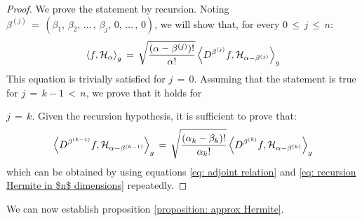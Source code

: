 \iflong \begin{proof}
    We prove the statement by recursion. Noting
    $\beta^{(j)}\,=\,(\beta_1,\,\beta_2,\,\dots\,,\,\beta_j,\, 0, \, \dots\,, \, 0) $, we will
    show that, for every $0\, \leq \,j\, \leq \,n$:
    $$
        \left \langle f, \mathcal H_\alpha \right \rangle_g \,=\,\sqrt{\frac
                {(\alpha-\beta^{(j)})!}{\alpha!}} \left \langle D^{\beta^{(j)}} f, \mathcal H_{\alpha-\beta^{(j)}} \right \rangle_g
    $$
    This equation is trivially satisfied for $j\,=\,0$. Assuming that the
    statement is true for $j\,=\,k-1\,<\,n$, we prove that it holds for

    $j\,=\,k$. Given the recursion hypothesis, it is sufficient to prove that:
    $$
        \left \langle
            D^{\beta^{(k-1)}} f, \mathcal H_{\alpha-\beta^{(k-1)}} \right
        \rangle_g \,=\,\sqrt{\frac {(\alpha_k-\beta_k)!}{\alpha_k!}} \left \langle
            D^{\beta^{(k)}} f, \mathcal H_{\alpha-\beta^{(k)}} \right \rangle_g
    $$
    which can be obtained by using equations \eqref{eq: adjoint relation} and \eqref{eq: recursion Hermite in
    $n$ dimensions} repeatedly.
\end{proof} \fi
We can now establish proposition \ref{proposition: approx Hermite}.

